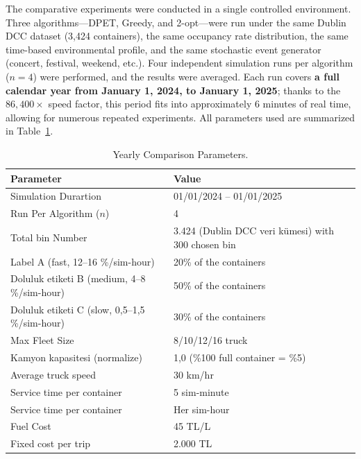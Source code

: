\documentclass[12pt,a4paper]{report}
\begin{document}
\indent The comparative experiments were conducted in a single controlled environment. Three algorithms—DPET, Greedy, and 2-opt—were run under the same Dublin DCC dataset (3,424 containers), the same occupancy rate distribution, the same time-based environmental profile, and the same stochastic event generator (concert, festival, weekend, etc.). Four independent simulation runs per algorithm (\(n = 4\)) were performed, and the results were averaged. Each run covers \textbf{a full calendar year from January 1, 2024, to January 1, 2025}; thanks to the \(86,400\times\) speed factor, this period fits into approximately 6 minutes of real time, allowing for numerous repeated experiments. All parameters used are summarized in Table~\ref{tab:test_config}.

\begin{table}[H]
\centering
\caption{Yearly Comparison Parameters.}
\label{tab:test_config}
\begin{tabular}{ll}
\toprule
\textbf{Parameter} & \textbf{Value} \\
\midrule
Simulation Durartion                            & 01/01/2024 -- 01/01/2025  \\
Run Per Algorithm (\(n\))        & 4 \\
Total bin Number                      & 3.424 (Dublin DCC veri kümesi) with 300 chosen bin \\
Label A (fast, 12--16 \%/sim-hour) & 20\% of the containers \\
Doluluk etiketi B (medium, 4--8 \%/sim-hour)    & 50\% of the containers\\
Doluluk etiketi C (slow, 0,5--1,5 \%/sim-hour) & 30\% of the containers \\
Max Fleet Size                 & 8/10/12/16 truck \\
Kamyon kapasitesi (normalize)                 & 1,0 (\%100 full container = \%5) \\
Average truck speed                          & 30 km/hr \\
Service time per container                & 5 sim-minute \\
Service time per container                       & Her sim-hour \\
Fuel Cost                                  & 45 TL/L \\
Fixed cost per trip                    & 2.000 TL \\
\bottomrule
\end{tabular}
\end{table}
\end{document}
